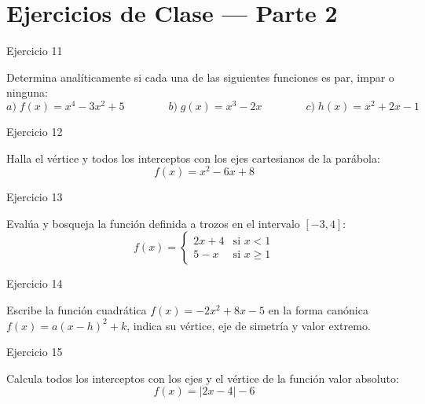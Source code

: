 \documentclass[aspectratio=169]{beamer}
\begin{document}
\section{Ejercicios de Clase — Parte 2}

\begin{frame}{Ejercicio 11}
  \begin{mwejercicio}
    Determina analíticamente si cada una de las siguientes funciones es par, impar o ninguna:
    $$a)\; f(x) = x^4 - 3x^2 + 5 \qquad\qquad b)\; g(x) = x^3 - 2x \qquad\qquad c)\; h(x) = x^2 + 2x - 1$$
  \end{mwejercicio}
  \vspace{3.5cm}
\end{frame}
\begin{frame}{Ejercicio 12}
  \begin{mwejercicio}
    Halla el vértice y todos los interceptos con los ejes cartesianos de la parábola:
    $$f(x) = x^2 - 6x + 8$$
  \end{mwejercicio}
  \vspace{3.5cm}
\end{frame}
\begin{frame}{Ejercicio 13}
  \begin{mwejercicio}
    Evalúa y bosqueja la función definida a trozos en el intervalo $[-3, 4]$:
    $$f(x) = \begin{cases} 2x + 4 & \text{si } x < 1 \\ 5 - x & \text{si } x \ge 1 \end{cases}$$
  \end{mwejercicio}
  \vspace{3.5cm}
\end{frame}
\begin{frame}{Ejercicio 14}
  \begin{mwejercicio}
    Escribe la función cuadrática $f(x) = -2x^2 + 8x - 5$ en la forma canónica $f(x) = a(x-h)^2 + k$, indica su vértice, eje de simetría y valor extremo.
  \end{mwejercicio}
  \vspace{3.5cm}
\end{frame}
\begin{frame}{Ejercicio 15}
  \begin{mwejercicio}
    Calcula todos los interceptos con los ejes y el vértice de la función valor absoluto:
    $$f(x) = |2x - 4| - 6$$
  \end{mwejercicio}
  \vspace{3.5cm}
\end{frame}
\end{document}
